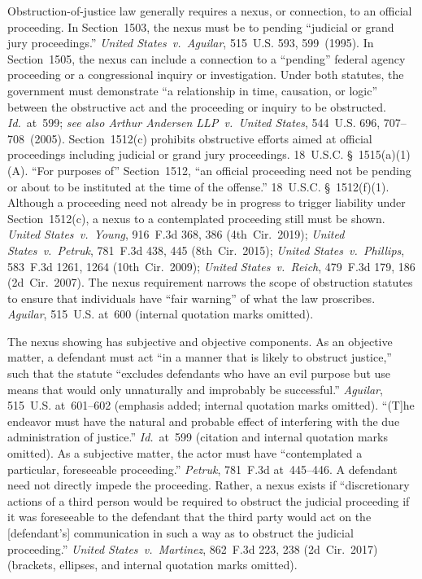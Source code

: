 Obstruction-of-justice law generally requires a nexus, or connection, to an official proceeding.
In Section~1503, the nexus must be to pending ``judicial or grand jury proceedings.''
\textit{United States~v.\ Aguilar}, 515~U.S. 593, 599~(1995).
In Section~1505, the nexus can include a connection to a ``pending'' federal agency proceeding or a congressional inquiry or investigation.
Under both statutes, the government must demonstrate ``a relationship in time, causation, or logic'' between the obstructive act and the proceeding or inquiry to be obstructed.
\textit{Id.}~at~599; \textit{see also Arthur Andersen LLP~v.\ United States}, 544~U.S. 696, 707--708~(2005).
Section~1512(c) prohibits obstructive efforts aimed at official proceedings including judicial or grand jury proceedings.
18~U.S.C. \S~1515(a)(1)(A).
``For purposes of\thinspace'' Section~1512, ``an official proceeding need not be pending or about to be instituted at the time of the offense.''
18~U.S.C. \S~1512(f)(1).
Although a proceeding need not already be in progress to trigger liability under Section~1512(c), a nexus to a contemplated proceeding still must be shown.
\textit{United States~v.\ Young}, 916~F.3d 368, 386 (4th~Cir.~2019);
\textit{United States~v.\ Petruk}, 781~F.3d 438, 445 (8th~Cir.~2015);
\textit{United States~v.\ Phillips}, 583~F.3d 1261, 1264 (10th~Cir.~2009);
\textit{United States~v.\ Reich}, 479~F.3d 179, 186 (2d~Cir.~2007).
The nexus requirement narrows the scope of obstruction statutes to ensure that individuals have ``fair warning'' of what the law proscribes.
\textit{Aguilar}, 515~U.S. at~600 (internal quotation marks omitted).

The nexus showing has subjective and objective components.
As an objective matter, a defendant must act ``in a manner that is likely to obstruct justice,'' such that the statute ``excludes defendants who have an evil purpose but use means that would only unnaturally and improbably be successful.''
\textit{Aguilar}, 515~U.S. at~601--602 (emphasis added; internal quotation marks omitted).
``(T]he endeavor must have the natural and probable effect of interfering with the due administration of justice.''
\textit{Id.}~at~599 (citation and internal quotation marks omitted).
As a subjective matter, the actor must have ``contemplated a particular, foreseeable proceeding.''
\textit{Petruk}, 781~F.3d at~445--446.
A defendant need not directly impede the proceeding.
Rather, a nexus exists if ``discretionary actions of a third person would be required to obstruct the judicial proceeding if it was foreseeable to the defendant that the third party would act on the [defendant's] communication in such a way as to obstruct the judicial proceeding.''
\textit{United States~v.\ Martinez}, 862~F.3d 223, 238 (2d~Cir.~2017) (brackets, ellipses, and internal quotation marks omitted).

